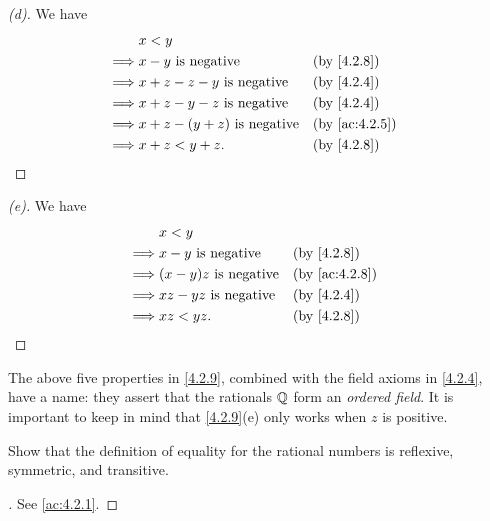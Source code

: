 \begin{proof}[(d)]
  We have
  \begin{align*}
             & x < y                                                  \\
    \implies & x - y \text{ is negative}           &  & \by{4.2.8}    \\
    \implies & x + z - z - y \text{ is negative}   &  & \by{4.2.4}    \\
    \implies & x + z - y - z \text{ is negative}   &  & \by{4.2.4}    \\
    \implies & x + z - (y + z) \text{ is negative} &  & \by{ac:4.2.5} \\
    \implies & x + z < y + z.                      &  & \by{4.2.8}
  \end{align*}
\end{proof}

\begin{proof}[(e)]
  We have
  \begin{align*}
             & x < y                                           \\
    \implies & x - y \text{ is negative}    &  & \by{4.2.8}    \\
    \implies & (x - y)z \text{ is negative} &  & \by{ac:4.2.8} \\
    \implies & xz - yz \text{ is negative}  &  & \by{4.2.4}    \\
    \implies & xz < yz.                     &  & \by{4.2.8}
  \end{align*}
\end{proof}

\begin{rmk}\label{4.2.10}
  The above five properties in \cref{4.2.9}, combined with the field axioms in \cref{4.2.4}, have a name:
  they assert that the rationals \(\mathbb{Q}\) form an \emph{ordered field}.
  It is important to keep in mind that \cref{4.2.9}(e) only works when \(z\) is positive.
\end{rmk}

\exercisesection

\begin{ex}\label{ex:4.2.1}
  Show that the definition of equality for the rational numbers is reflexive, symmetric, and transitive.
\end{ex}

\begin{proof}[]
  See \cref{ac:4.2.1}.
\end{proof}

